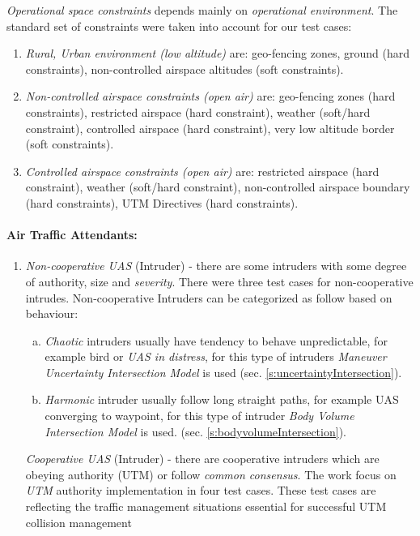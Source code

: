 \emph{Operational space constraints} depends mainly on \emph{operational environment}.  The standard set of constraints were taken into account for our test cases:
\begin{enumerate}
    \item \emph{Rural, Urban environment (low altitude)} are: geo-fencing zones, ground (hard constraints), non-controlled airspace altitudes (soft constraints).
    
    \item \emph{Non-controlled airspace constraints (open air)} are: geo-fencing zones (hard constraints), restricted airspace (hard constraint), weather (soft/hard constraint), controlled airspace (hard constraint), very low altitude border (soft constraints).
    
    \item \emph{Controlled airspace constraints (open air)} are: restricted airspace (hard constraint), weather (soft/hard constraint), non-controlled airspace boundary (hard constraints), UTM Directives (hard constraints).
\end{enumerate}

\paragraph{Air Traffic Attendants:} 
\begin{enumerate}
    \item \emph{Non-cooperative UAS} (Intruder) -  there are some intruders with some degree of authority, size and \emph{severity}. There were three test cases for non-cooperative intrudes. Non-cooperative Intruders can be categorized as follow based on behaviour:
    \begin{enumerate}[a.]
        \item\emph{Chaotic} intruders usually have tendency to behave unpredictable, for example bird or \emph{UAS in distress}, for this type of intruders \emph{Maneuver Uncertainty  Intersection Model} is used (sec. \ref{s:uncertaintyIntersection}).
        
        \item\emph{Harmonic} intruder usually follow long straight paths, for example UAS converging to waypoint, for this type of intruder \emph{Body Volume Intersection Model} is used. (sec. \ref{s:bodyvolumeIntersection}).
    \end{enumerate}

    \emph{Cooperative UAS} (Intruder) -  there are cooperative intruders which are obeying authority (UTM) or follow \emph{common consensus}. The work focus on \emph{UTM} authority implementation in four test cases. These test cases are reflecting the traffic management situations essential for successful UTM collision management
\end{enumerate}
    
